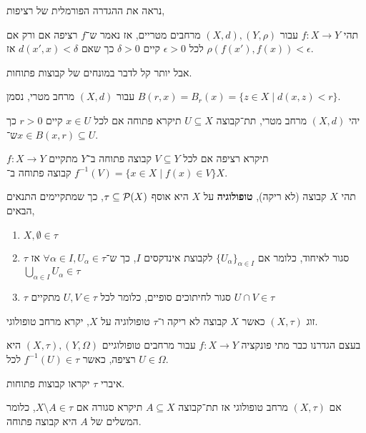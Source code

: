 נראה את ההגדרה הפורמלית של רציפות,
\begin{definition}[רציפות]\label{function_continuous_definition}
	תהי $f : X \to Y$ עבור $(X, d), (Y, \rho)$ מרחבים מטריים, אז נאמר ש־$f$ רציפה אם ורק אם לכל $\epsilon > 0$ קיים $\delta > 0$ כך שאם $d(x', x) < \delta$ אז $\rho(f(x'), f(x)) < \epsilon$.
\end{definition}
אבל יותר קל לדבר במונחים של קבוצות פתוחות.
\begin{definition}[כדור]
	עבור $(X, d)$ מרחב מטרי,
	נסמן $B(r, x) = B_r(x) = \{ z \in X \mid d(x, z) < r \}$.
\end{definition}
\begin{definition}
	יהי $(X, d)$ מרחב מטרי, תת־קבוצה $U \subseteq X$ תיקרא פתוחה אם לכל $x \in U$ קיים $r > 0$ כך ש־$x \in B(x, r) \subseteq U$.
\end{definition}
\begin{definition}
	$f : X \to Y$ תיקרא רציפה אם לכל $V \subseteq Y$ קבוצה פתוחה ב־$Y$ מתקיים $f^{-1}(V) = \{ x \in X \mid f(x) \in V \}$ קבוצה פתוחה ב־$X$.
\end{definition}
\begin{definition}[טופולוגיה]
	תהי $X$ קבוצה (לא ריקה), \textbf{טופולוגיה} על $X$ היא אוסף $\tau \subseteq \mathcal{P}(X)$, כך שמתקיימים התנאים הבאים,
	\begin{enumerate}
		\item $X, \emptyset \in \tau$
		\item $\tau$ סגור לאיחוד, כלומר אם ${\{U_\alpha\}}_{\alpha \in I}$ לקבוצת אינדקסים $I$, כך ש־$\forall \alpha \in I, U_\alpha \in \tau$ אז $\bigcup_{\alpha \in I} U_\alpha \in \tau$
		\item $\tau$ סגור לחיתוכים סופיים, כלומר לכל $U, V \in \tau$ מתקיים $U \cap V \in \tau$
	\end{enumerate}
\end{definition}
\begin{definition}
	זוג $(X, \tau)$ כאשר $X$ קבוצה לא ריקה ו־$\tau$ טופולוגיה על $X$, יקרא מרחב טופולוגי.
\end{definition}
\begin{remark}
	בעצם הגדרנו כבר מתי פונקציה $f : X \to Y$ עבור מרחבים טופולוגיים $(X, \tau), (Y, \Omega)$ היא רציפה, כאשר $f^{-1}(U) \in \tau$ לכל $U \in \Omega$.
\end{remark}
\begin{notation}
	איברי $\tau$ יקראו קבוצות פתוחות.
\end{notation}
\begin{definition}
	אם $(X, \tau)$ מרחב טופולוגי אז תת־קבוצה $A \subseteq X$ תיקרא סגורה אם $X \setminus A \in \tau$, כלומר המשלים של $A$ היא קבוצה פתוחה.
\end{definition}
